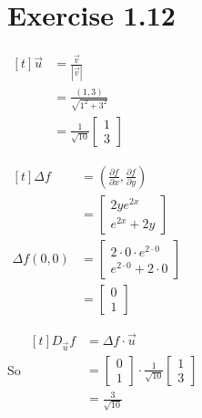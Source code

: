 \documentclass[11pt,fleqn]{book} %
\begin{document}
\section*{Exercise 1.12}

\begin{minipage}[t]{0.3\linewidth}
    $\begin{aligned}[t]
        \vec{u} & = \frac{\vec{v}}{| \vec{v} |}                             \\
                & = \frac{(1, 3)}{\sqrt{1^2 + 3^2}}                         \\
                & = \frac{1}{\sqrt{10}}\begin{bmatrix} 1 \\ 3 \end{bmatrix}
    \end{aligned}$
\end{minipage}
\begin{minipage}[t]{0.3\linewidth}
    $\begin{aligned}[t]
        \Delta f 
        & = \left( \frac{\partial f}{\partial x}, \frac{\partial f}{\partial y} \right) \\
        & = \begin{bmatrix} 2ye^{2x} \\ e^{2x} + 2y \end{bmatrix} \\
        \Delta f(0, 0) 
        & = \begin{bmatrix}
            2 \cdot 0 \cdot e^{2 \cdot 0} \\
            e^{2 \cdot 0} + 2 \cdot 0
        \end{bmatrix} \\
        &= \begin{bmatrix} 0 \\ 1 \end{bmatrix}
    \end{aligned}$

\end{minipage}
\begin{minipage}[t]{0.3\linewidth}
    So $\begin{aligned}[t]
        D_{\vec{u}} f 
        & = \Delta f \cdot \vec{u} \\
        & = \begin{bmatrix} 0 \\ 1 \end{bmatrix} \cdot \frac{1}{\sqrt{10}} \begin{bmatrix} 1 \\ 3 \end{bmatrix} \\
        & = \frac{3}{\sqrt{10}}
    \end{aligned}$
\end{minipage}
\end{document}
